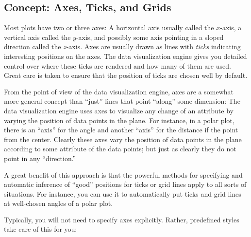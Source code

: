 \subsection{Concept: Axes, Ticks, and Grids}

Most plots have two or three axes: A horizontal axis usually called
the $x$-axis, a vertical axis called the $y$-axis, and possibly some
axis pointing in a sloped direction called the $z$-axis. Axes are
usually drawn as lines with \emph{ticks} indicating interesting
positions on the axes. The data visualization engine gives you
detailed control over where these ticks are rendered and how many of
them are used. Great care is taken to ensure that the position of
ticks are chosen well by default.

From the point of view of the data visualization engine, axes are a
somewhat more general concept than ``just'' lines that point ``along''
some dimension: The data visualization engine uses axes to visualize
any change of an attribute by varying the position of data points in the
plane. For instance, in a polar plot, there is an ``axis'' for the
angle and another ``axis'' for the distance if the point from the
center. Clearly these axes vary the position of data points in the
plane according to some attribute of the data points; but just as
clearly they do not point in any ``direction.''

A great benefit of this approach is that the powerful methods for
specifying and automatic inference of ``good'' positions for ticks or
grid lines apply to all sorts of situations. For instance, you can use
it to automatically put ticks and grid lines at well-chosen angles of
a polar plot.

Typically, you will not need to specify axes explicitly. Rather,
predefined styles take care of this for you:


    \begin{codeexample}[]
    \end{codeexample}


    \begin{codeexample}[]
    \end{codeexample}


